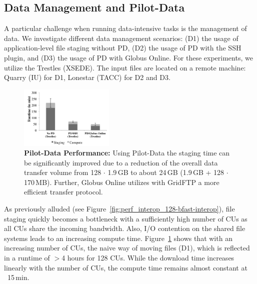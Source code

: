 \documentclass[conference]{IEEEtran}
\begin{document}
\subsection{Data Management and Pilot-Data}
\label{sec:experiment-pilotdata}

A particular challenge when running data-intensive tasks is the management of
data. We investigate different data management scenarios: (D1) the usage of 
application-level file staging without PD, (D2) the usage of PD with the SSH 
plugin, and (D3) the usage of PD with Globus Online. For these experiments, we
utilize the Trestles (XSEDE). The input files are located on a remote 
machine: Quarry (IU) for D1, Lonestar (TACC) for D2 and D3.

\begin{figure}[t]
	\upp
	\centering
		\includegraphics[width=0.4\textwidth]{../perf/sc/pd-128cus.pdf}
	\caption{\textbf{Pilot-Data Performance:} Using Pilot-Data the staging 
	time can be significantly improved due to a reduction of the overall data 
	transfer volume from 128 $\cdot$ 1.9\,GB to about 24\,GB (1.9\,GB + 128 
	$\cdot$ 170\,MB). Further, Globus Online utilizes with GridFTP a more 
	efficient transfer protocol.\up\up}
	\label{fig:perf_sc_download-concurrent-cus}
\end{figure}

As previously alluded (see Figure~\ref{fig:perf_interop_128-bfast-interop}),
file staging quickly becomes a bottleneck with a sufficiently high number of
CUs as all CUs share the incoming bandwidth. Also, I/O contention on the
shared file systems leads to an increasing compute time.
Figure~\ref{fig:perf_sc_download-concurrent-cus} shows that with an increasing
number of CUs, the naive way of moving files (D1), which is reflected in a
runtime of $>$4 hours for 128 CUs. While the download time increases linearly
with the number of CUs, the compute time remains almost constant at ~15\,min.

\end{document}
